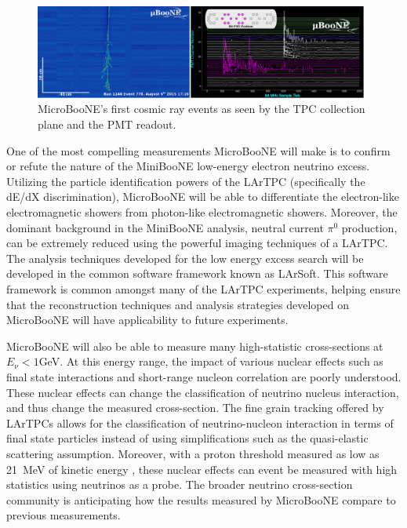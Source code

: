 \begin{figure}[htb]
\centering
\includegraphics[width=0.98\textwidth]{images/microbooneEvents.png}
\caption[]{MicroBooNE's first cosmic ray events as seen by the TPC collection plane and the PMT readout.}
\label{fig:ubooneEvents}
\end{figure}
One of the most compelling measurements MicroBooNE will make is to confirm or refute the nature of the MiniBooNE low-energy electron neutrino excess. Utilizing the particle identification powers of the LArTPC (specifically the dE/dX discrimination), MicroBooNE will be able to differentiate the electron-like electromagnetic showers from photon-like electromagnetic showers. Moreover, the dominant background in the MiniBooNE analysis, neutral current $\pi^{0}$ production, can be extremely reduced using the powerful imaging techniques of a LArTPC. The analysis techniques developed for the low energy excess search will be developed in the common software framework known as LArSoft. This software framework is common amongst many of the LArTPC experiments, helping ensure that the reconstruction techniques and analysis strategies developed on MicroBooNE will have applicability to future experiments.

MicroBooNE will also be able to measure many high-statistic cross-sections at $E_{\nu} < 1$GeV. At this energy range, the impact of various nuclear effects such as final state interactions and short-range nucleon correlation are poorly understood. These nuclear effects can change the classification of neutrino nucleus interaction, and thus change the measured cross-section. The fine grain tracking offered by LArTPCs allows for the classification of neutrino-nucleon interaction in terms of final state particles instead of using simplifications such as the quasi-elastic scattering assumption. Moreover, with a proton threshold measured as low as 21~MeV of kinetic energy \cite{Argoneut}, these nuclear effects can event be measured with high statistics using neutrinos as a probe. The broader neutrino cross-section community is anticipating how the results measured by MicroBooNE compare to previous measurements.

